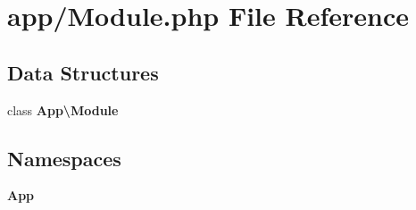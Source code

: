 \section{app/\+Module.php File Reference}
\label{_module_8php}
\subsection*{Data Structures}
\begin{DoxyCompactItemize}
\item 
class {\bf App\textbackslash{}\+Module}
\end{DoxyCompactItemize}
\subsection*{Namespaces}
\begin{DoxyCompactItemize}
\item 
 {\bf App}
\end{DoxyCompactItemize}
